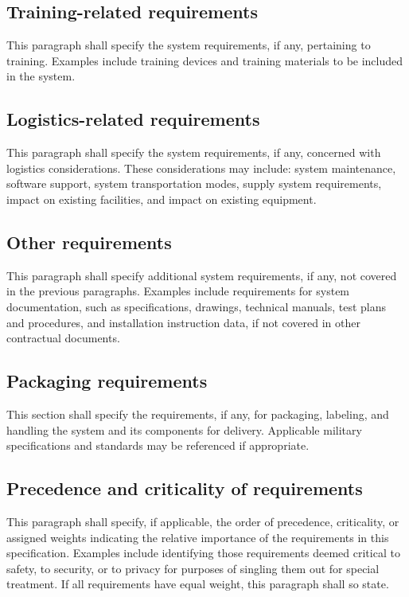 \documentclass{fidata-report-template}
\begin{document}
\subsection{Training-related requirements}

This paragraph shall specify the system requirements, if any, pertaining
to training. Examples include training devices and training materials to
be included in the system.

\subsection{Logistics-related requirements}

This paragraph shall specify the system requirements, if any, concerned
with logistics considerations. These considerations may include: system
maintenance, software support, system transportation modes, supply
system requirements, impact on existing facilities, and impact on
existing equipment.

\subsection{Other requirements}

This paragraph shall specify additional system requirements, if any, not
covered in the previous paragraphs. Examples include requirements for
system documentation, such as specifications, drawings, technical
manuals, test plans and procedures, and installation instruction data,
if not covered in other contractual documents.

\subsection{Packaging requirements}

This section shall specify the requirements, if any, for packaging,
labeling, and handling the system and its components for delivery.
Applicable military specifications and standards may be referenced if
appropriate.

\subsection{Precedence and criticality of requirements}

This paragraph shall specify, if applicable, the order of precedence,
criticality, or assigned weights indicating the relative importance of
the requirements in this specification. Examples include identifying
those requirements deemed critical to safety, to security, or to privacy
for purposes of singling them out for special treatment. If all
requirements have equal weight, this paragraph shall so state.
\end{document}
